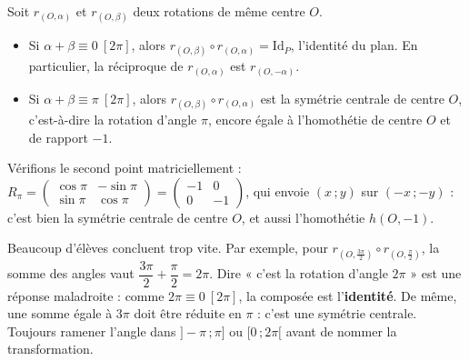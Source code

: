 \documentclass[11pt]{article}
\newcommand{\cle}[1]{{\popxbold\color{popdark}#1}}
\begin{document}
\begin{propriete}
Soit $r_{(O,\alpha)}$ et $r_{(O,\beta)}$ deux rotations de même centre $O$.
\begin{itemize}
\item Si $\alpha + \beta \equiv 0 \ [2\pi]$, alors $r_{(O,\beta)} \circ r_{(O,\alpha)} = \mathrm{Id}_P$, l'\cle{identité} du plan. En particulier, la réciproque de $r_{(O,\alpha)}$ est $r_{(O,-\alpha)}$.
\item Si $\alpha + \beta \equiv \pi \ [2\pi]$, alors $r_{(O,\beta)} \circ r_{(O,\alpha)}$ est la \cle{symétrie centrale} de centre $O$, c'est-à-dire la rotation d'angle $\pi$, encore égale à l'homothétie de centre $O$ et de rapport $-1$.
\end{itemize}
\end{propriete}

Vérifions le second point matriciellement : $R_\pi = \begin{pmatrix} \cos\pi & -\sin\pi \\ \sin\pi & \cos\pi \end{pmatrix} = \begin{pmatrix} -1 & 0 \\ 0 & -1 \end{pmatrix}$, qui envoie $(x\,;y)$ sur $(-x\,;-y)$ : c'est bien la symétrie centrale de centre $O$, et aussi l'homothétie $h(O,-1)$.

\begin{attention}
Beaucoup d'élèves concluent trop vite. Par exemple, pour $r_{\left(O,\frac{3\pi}{2}\right)} \circ r_{\left(O,\frac{\pi}{2}\right)}$, la somme des angles vaut $\dfrac{3\pi}{2}+\dfrac{\pi}{2} = 2\pi$. Dire « c'est la rotation d'angle $2\pi$ » est une réponse maladroite : comme $2\pi \equiv 0 \ [2\pi]$, la composée est l'\textbf{identité}. De même, une somme égale à $3\pi$ doit être réduite en $\pi$ : c'est une symétrie centrale. Toujours ramener l'angle dans $]-\pi\,;\pi]$ ou $[0\,;2\pi[$ avant de nommer la transformation.
\end{attention}
\end{document}
